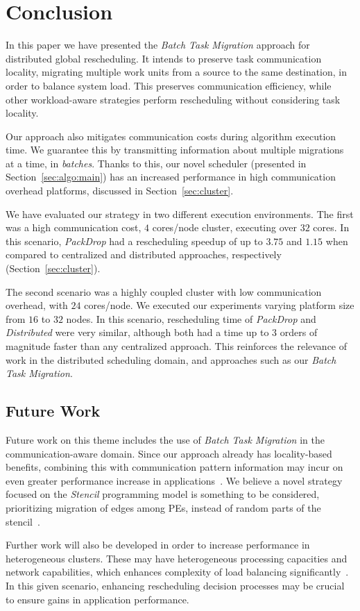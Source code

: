 \section{Conclusion} \label{sec:conclusion}

In this paper we have presented the \textit{Batch Task Migration} approach for distributed global rescheduling.
It intends to preserve task communication locality, migrating multiple work units from a source to the same destination, in order to balance system load.
This preserves communication efficiency, while other workload-aware strategies perform rescheduling without considering task locality.

Our approach also mitigates communication costs during algorithm execution time.
We guarantee this by transmitting information about multiple migrations at a time, in \textit{batches}.
Thanks to this, our novel scheduler (presented in Section~\ref{sec:algo:main}) has an increased performance in high communication overhead platforms, discussed in Section~\ref{sec:cluster}.

We have evaluated our strategy in two different execution environments. 
The first was a high communication cost, $4$ cores/node cluster, executing over $32$ cores.
In this scenario, \textit{PackDrop} had a rescheduling speedup of up to $3.75$ and $1.15$ when compared to centralized and distributed approaches, respectively (Section~\ref{sec:cluster}).

The second scenario was a highly coupled cluster with low communication overhead, with $24$ cores/node.
We executed our experiments varying platform size from $16$ to $32$ nodes.
In this scenario, rescheduling time of \textit{PackDrop} and \textit{Distributed} were very similar, although both had a time up to $3$ orders of magnitude faster than any centralized approach. %
This reinforces the relevance of work in the distributed scheduling domain, and approaches such as our \textit{Batch Task Migration}.

\subsection{Future Work}

Future work on this theme includes the use of \textit{Batch Task Migration} in the communication-aware domain.
Since our approach already has locality-based benefits, combining this with communication pattern information may incur on even greater performance increase in applications~\cite{Unat2017localitysurvey,commaware}.
We believe a novel strategy focused on the \textit{Stencil} programming model is something to be considered, prioritizing migration of edges among PEs, instead of random parts of the stencil~\cite{stenciltiling}.

Further work will also be developed in order to increase performance in heterogeneous clusters.
These may have heterogeneous processing capacities and network capabilities, which enhances complexity of load balancing significantly~\cite{Beri2015hetws,Cheriere2015hetdist}.
In this given scenario, enhancing rescheduling decision processes may be crucial to ensure gains in application performance.